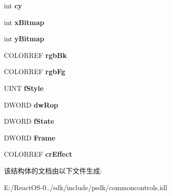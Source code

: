 \begin{DoxyCompactItemize}
\mbox{\label{struct_i_m_a_g_e_l_i_s_t_d_r_a_w_p_a_r_a_m_s_af750576934dd08fc56aa1ee8d8d59c73}} 
int {\bfseries cy}
\item 
\mbox{\label{struct_i_m_a_g_e_l_i_s_t_d_r_a_w_p_a_r_a_m_s_ac47d03bad5c6d9025a41e1e9ddf057d7}} 
int {\bfseries x\+Bitmap}
\item 
\mbox{\label{struct_i_m_a_g_e_l_i_s_t_d_r_a_w_p_a_r_a_m_s_a5d5ed7a0bf242e54d8f7caca11154277}} 
int {\bfseries y\+Bitmap}
\item 
\mbox{\label{struct_i_m_a_g_e_l_i_s_t_d_r_a_w_p_a_r_a_m_s_a09d347f247b9d84ec530b5e84f55a343}} 
C\+O\+L\+O\+R\+R\+EF {\bfseries rgb\+Bk}
\item 
\mbox{\label{struct_i_m_a_g_e_l_i_s_t_d_r_a_w_p_a_r_a_m_s_a488a54d14e9d5ccea4bdddf2cdebb150}} 
C\+O\+L\+O\+R\+R\+EF {\bfseries rgb\+Fg}
\item 
\mbox{\label{struct_i_m_a_g_e_l_i_s_t_d_r_a_w_p_a_r_a_m_s_a18e51e5786ef366bc07cb91e26ec5c19}} 
U\+I\+NT {\bfseries f\+Style}
\item 
\mbox{\label{struct_i_m_a_g_e_l_i_s_t_d_r_a_w_p_a_r_a_m_s_a6d48af7d7da78e4526dfb57832599965}} 
D\+W\+O\+RD {\bfseries dw\+Rop}
\item 
\mbox{\label{struct_i_m_a_g_e_l_i_s_t_d_r_a_w_p_a_r_a_m_s_a7e4a3bc99b04a778948cefbaf18d9337}} 
D\+W\+O\+RD {\bfseries f\+State}
\item 
\mbox{\label{struct_i_m_a_g_e_l_i_s_t_d_r_a_w_p_a_r_a_m_s_a92529b85c11aebc3325d027f45920ab3}} 
D\+W\+O\+RD {\bfseries Frame}
\item 
\mbox{\label{struct_i_m_a_g_e_l_i_s_t_d_r_a_w_p_a_r_a_m_s_ad009c40c1af625020ce0e2ade0a8d2e4}} 
C\+O\+L\+O\+R\+R\+EF {\bfseries cr\+Effect}
\end{DoxyCompactItemize}


该结构体的文档由以下文件生成\+:\begin{DoxyCompactItemize}
\item 
E\+:/\+React\+O\+S-\/0../sdk/include/psdk/commoncontrols.\+idl\end{DoxyCompactItemize}
